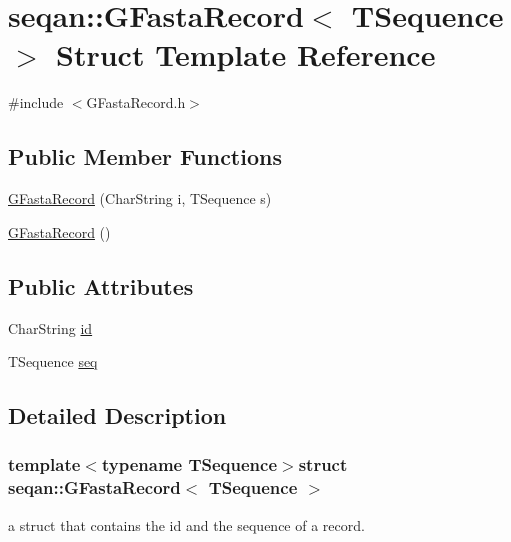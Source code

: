 \hypertarget{structseqan_1_1_g_fasta_record}{\section{seqan\-:\-:G\-Fasta\-Record$<$ T\-Sequence $>$ Struct Template Reference}
\label{structseqan_1_1_g_fasta_record}
}


{\ttfamily \#include $<$G\-Fasta\-Record.\-h$>$}

\subsection*{Public Member Functions}
\begin{DoxyCompactItemize}
\item 
\hyperlink{structseqan_1_1_g_fasta_record_aab6a24e2129b61ff86d56bc2b6b9e9a3}{G\-Fasta\-Record} (Char\-String i, T\-Sequence s)
\item 
\hyperlink{structseqan_1_1_g_fasta_record_a605409d17ae67a8bd374d135bc6a3cc4}{G\-Fasta\-Record} ()
\end{DoxyCompactItemize}
\subsection*{Public Attributes}
\begin{DoxyCompactItemize}
\item 
Char\-String \hyperlink{structseqan_1_1_g_fasta_record_a9fc0e5fb39002e38b528f34906899941}{id}
\item 
T\-Sequence \hyperlink{structseqan_1_1_g_fasta_record_a55a6d2deb7ef975f28a4aac89c779702}{seq}
\end{DoxyCompactItemize}


\subsection{Detailed Description}
\subsubsection*{template$<$typename T\-Sequence$>$struct seqan\-::\-G\-Fasta\-Record$<$ T\-Sequence $>$}

a struct that contains the id and the sequence of a record. 

